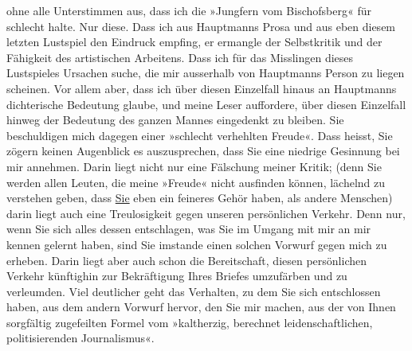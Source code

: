\begin{ledgroupsized}[t]{13cm}
               ohne alle Unterstimmen aus, dass ich die »Jungfern
                  vom Bischofsberg« für schlecht halte. Nur diese. Dass ich aus Hauptmanns Prosa und aus eben diesem letzten
               Lustspiel den Eindruck empfing, er ermangle der Selbstkritik und der Fähigkeit des
               artistischen Arbeitens. Dass ich für das Misslingen dieses Lustspieles Ursachen
               suche, die mir ausserhalb von Hauptmanns
               Person zu liegen scheinen. Vor allem aber, dass ich über diesen Einzelfall hinaus an
                  Hauptmanns dichterische Bedeutung glaube,
               und meine Leser auffordere, über diesen Einzelfall hinweg der Bedeutung des ganzen
               Mannes eingedenkt zu bleiben.\pend
           \pstart
           Sie beschuldigen mich dagegen einer »schlecht verhehlten Freude«. Dass heisst, Sie
               zögern keinen Augenblick es auszusprechen, dass Sie eine
               niedrige Gesinnung bei mir annehmen. Darin liegt nicht nur eine Fälschung meiner
               Kritik; (denn Sie werden allen Leuten, die meine »Freude« nicht ausfinden können,
               lächelnd zu verstehen geben, dass \uline{Sie} eben ein
               feineres Gehör haben, als andere Menschen) darin liegt auch eine Treulosigkeit gegen
               unseren persönlichen Verkehr. Denn nur, wenn Sie sich alles dessen entschlagen, was
               Sie im Umgang mit mir an mir kennen gelernt haben, sind Sie imstande einen solchen
               Vorwurf gegen mich zu erheben. Darin liegt aber auch schon die Bereitschaft, diesen
               persönlichen Verkehr künftighin zur Bekräftigung Ihres Briefes umzufärben und zu
               verleumden.\pend
           \pstart
           Viel deutlicher geht das Verhalten, zu dem Sie sich entschlossen haben, aus dem
               andern Vorwurf hervor, den Sie mir machen, aus der von Ihnen sorgfältig zugefeilten
               Formel vom »kaltherzig, berechnet leidenschaftlichen, politisierenden Journalismus«.

\end{ledgroupsized}
